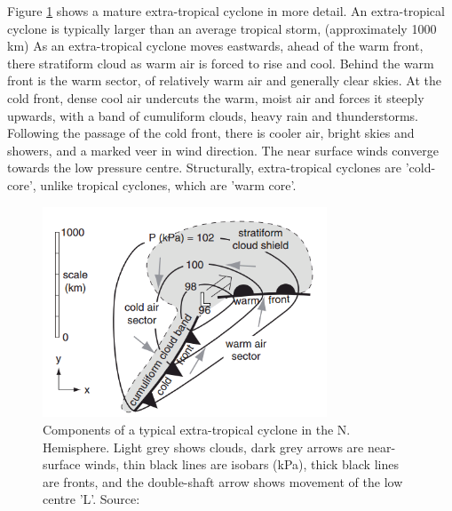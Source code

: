 Figure \ref{fig:ET_structure} shows a mature extra-tropical cyclone in more detail. An extra-tropical cyclone is typically larger than an average tropical storm, (approximately 1000 km)
As an extra-tropical cyclone moves eastwards, ahead of the warm front, there stratiform cloud as warm air is forced to rise and cool. Behind the warm front is the warm sector, of relatively warm air and generally clear skies. At the cold front, dense cool air undercuts the warm, moist air and forces it steeply upwards, with a band of cumuliform clouds, heavy rain and thunderstorms. Following the passage of the cold front, there is cooler air, bright skies and showers, and a marked veer in wind direction. The near surface winds converge towards the low pressure centre. Structurally, extra-tropical cyclones are 'cold-core', unlike tropical cyclones, which are 'warm core'.

\begin{figure}[h]
	\centering
	\noindent\includegraphics[width=20pc,angle=0]{ET_structure.png}
	\caption{Components of a typical extra-tropical cyclone in the N. Hemisphere. Light grey shows clouds, dark grey arrows are near-surface winds, thin black lines are isobars (kPa), thick black lines are fronts, and the double-shaft arrow shows movement of the low centre 'L'. Source: \cite{stull} }\label{fig:ET_structure}
\end{figure}


